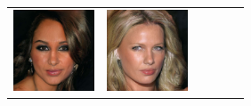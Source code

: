 \documentclass{article}
\newcommand{\pganw}{0.95in}
\begin{document}
\begin{table}[htbp]
\begin{center}
\begin{tabular}{cc|cc|cc}
\includegraphics[width=\pganw]{figures/pgan/55_base_iso_base.jpg} &
\includegraphics[width=\pganw]{figures/pgan/54_base_iso_reject.jpg} &

\end{tabular}
\end{center}
\end{table}
\end{document}
